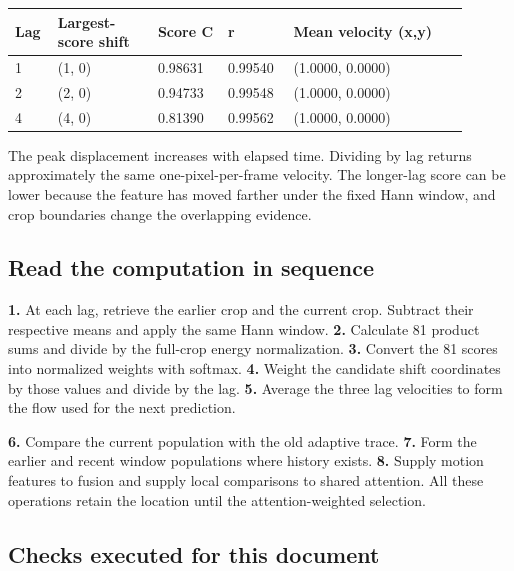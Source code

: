 \documentclass[11pt,letterpaper]{article}
\begin{document}
\begin{center}\small\renewcommand{\arraystretch}{1.16}\setlength{\tabcolsep}{4pt}\begin{tabular}{p{0.070\linewidth}p{0.208\linewidth}p{0.143\linewidth}p{0.129\linewidth}p{0.351\linewidth}}\toprule

\textbf{Lag} & \textbf{Largest-score shift} & \textbf{Score C} & \textbf{r} & \textbf{Mean velocity (x,y)} \\

\midrule

1 & (1, 0) & 0.98631 & 0.99540 & (1.0000, 0.0000) \\

2 & (2, 0) & 0.94733 & 0.99548 & (1.0000, 0.0000) \\

4 & (4, 0) & 0.81390 & 0.99562 & (1.0000, 0.0000) \\

\bottomrule\end{tabular}\end{center}

The peak displacement increases with elapsed time. Dividing by lag returns approximately the same one-pixel-per-frame velocity. The longer-lag score can be lower because the feature has moved farther under the fixed Hann window, and crop boundaries change the overlapping evidence.


\subsection*{Read the computation in sequence}

\textbf{1.} At each lag, retrieve the earlier crop and the current crop. Subtract their respective means and apply the same Hann window. \textbf{2.} Calculate 81 product sums and divide by the full-crop energy normalization. \textbf{3.} Convert the 81 scores into normalized weights with softmax. \textbf{4.} Weight the candidate shift coordinates by those values and divide by the lag. \textbf{5.} Average the three lag velocities to form the flow used for the next prediction.


\textbf{6.} Compare the current population with the old adaptive trace. \textbf{7.} Form the earlier and recent window populations where history exists. \textbf{8.} Supply motion features to fusion and supply local comparisons to shared attention. All these operations retain the location until the attention-weighted selection.


\subsection*{Checks executed for this document}
\end{document}
